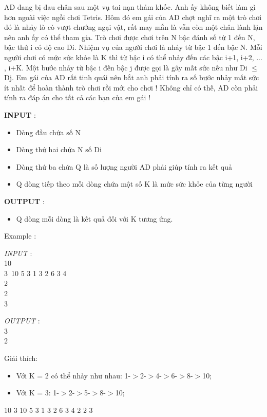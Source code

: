 



   AD đang bị đau chân sau một vụ tai nạn thảm khốc. Anh ấy không biết làm gì hơn ngoài việc ngồi chơi Tetris. Hôm đó em gái của AD chợt nghĩ ra một trò chơi đó là nhảy lò cò vượt chướng ngại vật, rất may mắn là vẫn còn một chân lành lặn nên anh ấy có thể tham gia. Trò chơi được chơi trên N bậc đánh số từ 1 đến N, bậc thứ i có độ cao Di. Nhiệm vụ của người chơi là nhảy từ bậc 1 đến bậc N. Mỗi người chơi có mức sức khỏe là K thì từ bậc i có thể nhảy đến các bậc i+1, i+2, ... , i+K. Một bước nhảy từ bậc i đến bậc j được gọi là gây mất sức nếu như Di  $\le$  Dj. Em gái của AD rất tinh quái nên bắt anh phải tính ra số bước nhảy mất sức ít nhất để hoàn thành trò chơi rồi mới cho chơi ! Không chỉ có thế, AD còn phải tính ra đáp án cho tất cả các bạn của em gái !  

\textbf{    INPUT   }   :  
\begin{itemize}
	\item     Dòng đầu chứa số N   
	\item     Dòng thứ hai chứa N số Di   
	\item     Dòng thứ ba chứa Q là số lượng người AD phải giúp tính ra kết quả   
	\item     Q dòng tiếp theo mỗi dòng chứa một số K là mức sức khỏe của từng người   
\end{itemize}

\textbf{    OUTPUT   }   :  
\begin{itemize}
	\item     Q dòng mỗi dòng là kết quả đối với K tương ứng.   
\end{itemize}

    Example      :  

\emph{    INPUT   }   :   
\\   10   
\\   3 10 5 3 1 3 2 6 3 4   
\\   2   
\\   2   
\\   3  

\emph{    OUTPUT   }   :   
\\   3   
\\   2  

   Giải thích:  
\begin{itemize}
	\item     Với K = 2 có thể nhảy như nhau: 1-$>$2-$>$4-$>$6-$>$8-$>$10;   
	\item     Với K = 3: 1-$>$2-$>$5-$>$8-$>$10;   
\end{itemize}     10       3 10 5 3 1 3 2 6 3 4       2       2       3    

